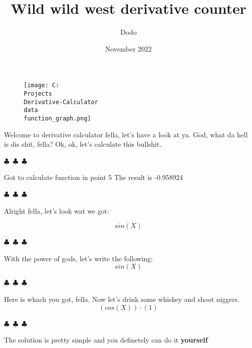 \documentclass{article}
\title{Wild wild west derivative counter}
\author{Dodo}
\date{November 2022}
\begin{document}
    \maketitle
    \begin{figure} \texttt{[image: C:\\Projects\\Derivative-Calculator\\data\\function\_graph.png]} \end{figure}
        Welcome to derivative calculator fella, let's have a look at ya. God, what da hell is dis shit, fella?
        Ok, ok, let's calculate this bullshit.

        \begin{center}
        $\clubsuit$~$\clubsuit$~$\clubsuit$
        \end{center}
    Got to calculate function in point 5
The result is -0.958924\begin{center} $\clubsuit$~$\clubsuit$~$\clubsuit$ \end{center}Alright fella, let's look wat we got:

\begin{equation}
{sin({X})}
\end{equation}
\begin{center} $\clubsuit$~$\clubsuit$~$\clubsuit$ \end{center}With the power of gods, let's write the following:
\begin{equation}
{sin({X})}
\end{equation}
\begin{center} $\clubsuit$~$\clubsuit$~$\clubsuit$ \end{center}Here is whach you got, fella. Now let's drink some whiskey and shoot niggers.
\begin{equation}
{({cos({X})})\cdot({1})}
\end{equation}
\begin{center} $\clubsuit$~$\clubsuit$~$\clubsuit$ \end{center}
        The solution is pretty simple and you definetely can do it \textbf{yourself}
        
\end{document}
